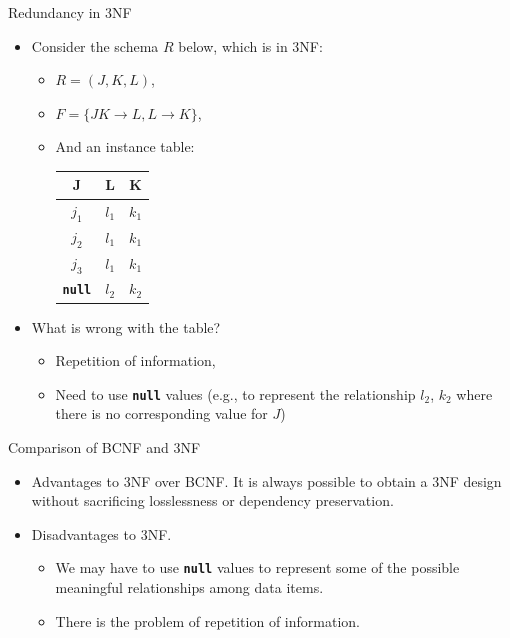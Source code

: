 \documentclass{beamer}
\begin{document}
\begin{frame}{Redundancy in 3NF}
    \begin{itemize}
        \item Consider the schema $R$ below, which is in 3NF:
            \begin{itemize}
                \item $R = (J, K, L )$,
                \item $F = \{JK \rightarrow L, L \rightarrow K \}$,
                \item And an instance table:
                    \begin{center}
                        \begin{tabular}{| c | c | c |}
                            \hline
                            J     & L     & K     \\
                            \hline
                            $j_1$ & $l_1$ & $k_1$ \\
                            $j_2$ & $l_1$ & $k_1$ \\
                            $j_3$ & $l_1$ & $k_1$ \\
                            \texttt{\textbf{null}} & $l_2$ & $k_2$ \\
                            \hline
                        \end{tabular}
                    \end{center}
            \end{itemize}
        \item What is wrong with the table? \pause
            \begin{itemize}
                \item Repetition of information,
                \item Need to use \texttt{\textbf{null}} values (e.g., to represent the relationship $l_2$, $k_2$ where there is no corresponding value for $J$)
            \end{itemize}
    \end{itemize}
\end{frame}

\begin{frame}{Comparison of BCNF and 3NF}
    \begin{itemize}
        \item Advantages to 3NF over BCNF. It is always possible to obtain a 3NF design without sacrificing losslessness or dependency preservation.
        \item Disadvantages to 3NF.
            \begin{itemize}
                \item We may have to use \texttt{\textbf{null}} values to represent some of the possible meaningful relationships among data items.
                \item There is the problem of repetition of information.
            \end{itemize}
    \end{itemize}
\end{frame}
\end{document}
